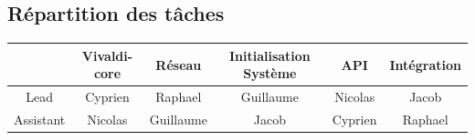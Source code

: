 \documentclass[11pt,a4paper]{article}
\begin{document}
\subsection{Répartition des tâches}
\begin{tabular}{|c|c|c|c|c|c|}
  \hline
  & Vivaldi-core & Réseau & Initialisation Système & API & Intégration \\
  \hline
  Lead & Cyprien & Raphael & Guillaume & Nicolas & Jacob \\
  \hline
  Assistant & Nicolas & Guillaume & Jacob & Cyprien & Raphael \\
  \hline
\end{tabular}
\end{document}

